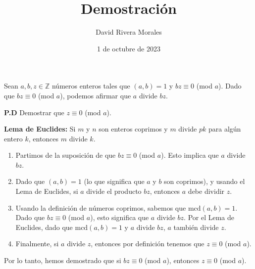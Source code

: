 \documentclass{article}
\author{David Rivera Morales}
\title{Demostración}
\date{1 de octubre de 2023}
\begin{document}
\maketitle
Sean \( a, b, z \in \mathbb{Z} \) números enteros tales que \( (a, b) = 1 \) y \( bz \equiv 0 \) (mod \( a \)). Dado que \( bz \equiv 0 \) (mod \( a \)), podemos afirmar que \( a \) divide \( bz \).

\textbf{P.D} Demostrar que \( z \equiv 0 \) (mod \( a \)).

\textbf{Lema de Euclides:} Si \( m \) y \( n \) son enteros coprimos y \( m \) divide \( pk \) para algún entero \( k \), entonces \( m \) divide \( k \).

\begin{Demostración}
\begin{enumerate}
    \item Partimos de la suposición de que \( bz \equiv 0 \) (mod \( a \)). Esto implica que \( a \) divide \( bz \).
    \item Dado que \( (a, b) = 1 \) (lo que significa que \( a \) y \( b \) son coprimos), y usando el Lema de Euclides, si \( a \) divide el producto \( bz \), entonces \( a \) debe dividir \( z \).
    \item Usando la definición de números coprimos, sabemos que \( \text{mcd}(a, b) = 1 \). Dado que \( bz \equiv 0 \) (mod \( a \)), esto significa que \( a \) divide \( bz \). Por el Lema de Euclides, dado que \( \text{mcd}(a, b) = 1 \) y \( a \) divide \( bz \), \( a \) también divide \( z \).
    \item Finalmente, si \( a \) divide \( z \), entonces por definición tenemos que \( z \equiv 0 \) (mod \( a \)).
\end{enumerate}
Por lo tanto, hemos demostrado que si \( bz \equiv 0 \) (mod \( a \)), entonces \( z \equiv 0 \) (mod \( a \)).
\end{Demostración}
\end{document}
